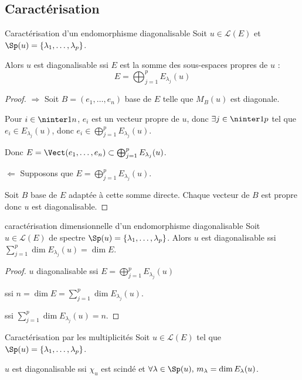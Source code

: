 \subsection{Caractérisation}

\begin{theoreme}{Caractérisation d'un endomorphisme diagonalisable}{}
    Soit $u \in \mathscr L(E)$ et $\Sp(u) = \{\lambda_1, \ldots, \lambda_p\}$.

    Alors $u$ est diagonalisable ssi $E$ est la somme des sous-espaces propres de $u$ :
    $$E = \bigoplus_{j = 1 }^{ p } E_{\lambda_j}(u)$$
\end{theoreme}


\begin{proof}
    $\Rightarrow$ Soit $B = (e_1, \ldots, e_n)$ base de $E$ telle que $M_B(u)$ est diagonale.

    Pour $i \in \ninter 1 n$, $e_i$ est un vecteur propre de $u$, donc $\exists j \in \ninter 1 p$
    tel que $e_i \in E_{\lambda_j}(u)$, donc $e_i \in \bigoplus_{j = 1 }^{ p } E_{\lambda_j}(u)$.

    Donc $E = \Vect(e_1, \ldots, e_n) \subset \bigoplus_{j = 1 }^{ p } E_{\lambda_j}(u)$.

    \lvspace $\Leftarrow$ Supposons que $\displaystyle E = \bigoplus_{j = 1 }^{ p } E_{\lambda_j}(u)$.

    Soit $B$ base de $E$ adaptée à cette somme directe. Chaque vecteur de $B$ est propre donc 
    $u$ est diagonalisable.
\end{proof}

\begin{corollairent}{caractérisation dimensionnelle d'un endomorphisme diagonalisable}{}
    Soit $u \in \mathscr L(E)$ de spectre $\Sp(u) = \{\lambda_1, \ldots, \lambda_p\}$.
    Alors $u$ est diagonalisable ssi $\displaystyle \sum_{j = 1 }^{p } \dim E_{\lambda_j}(u) = \dim E$.
\end{corollairent}

\begin{proof}
    $u$ diagonalisable ssi $\displaystyle E = \bigoplus_{j = 1 }^{ p } E_{\lambda_j}(u)$
    
    ssi $\displaystyle n = \dim E = \sum_{j = 1 }^{ p } \dim E_{\lambda_j}(u)$.

    ssi $\displaystyle \sum_{j = 1 }^{ p } \dim E_{\lambda_j}(u) = n$.
\end{proof}


\begin{theoreme}{Caractérisation par les multiplicités}{}
    Soit $u \in \mathscr L(E)$ tel que $\Sp(u) = \{\lambda_1, \ldots, \lambda_p\}$.

    $u$ est diagonalisable ssi $\chi_u$ est scindé et $\forall \lambda \in \Sp(u), \, m_\lambda = \dim E_\lambda(u)$.
\end{theoreme}

